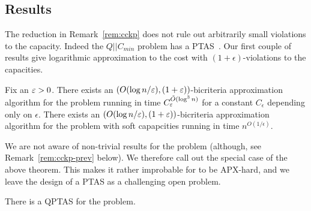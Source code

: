 \subsection{Results}
The reduction in Remark~\ref{rem:cckp} does not rule out arbitrarily small violations to the capacity. Indeed the $Q||C_{min}$ problem has a PTAS~\cite{AzarE98}.
Our first couple of results give logarithmic approximation to the cost with $(1+\epsilon)$-violations to the capacities.
\begin{theorem}\label{thm:1}
	Fix an $\varepsilon > 0$. There exists an $(O(\log n/\varepsilon), (1+\varepsilon))$-bicriteria approximation algorithm for the \mckc problem running in time $C_\varepsilon^{\tilde{O}(\log^3n)}$ for a constant $C_\epsilon$ depending only on $\epsilon$. There exists an $(O(\log n/\varepsilon), (1+\varepsilon))$-bicriteria approximation algorithm for the \mckc problem with soft capapcities running in time $n^{O(1/\epsilon)}$.
\end{theorem}
We are not aware of non-trivial results for the \cckp problem (although, see Remark~\ref{rem:cckp-prev} below). We therefore call out the special case of the above theorem.
This makes it rather improbable for \cckp to be APX-hard, and we leave the design of a PTAS as a challenging open problem.
\begin{theorem}\label{thm:q}
	There is a QPTAS for the \cckp problem.
\end{theorem}

